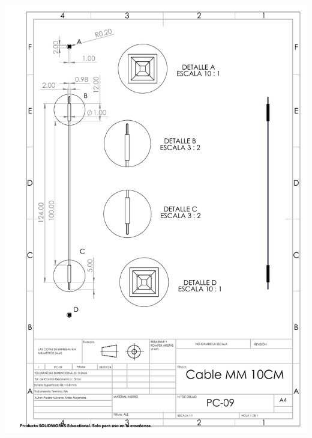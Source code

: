 \begin{center}
\includegraphics[width=.9\textwidth]{22/img/cableMMDibujo.PDF}~\\[15cm]

\end{center}





% 
% 
\appendix
% 
% 
